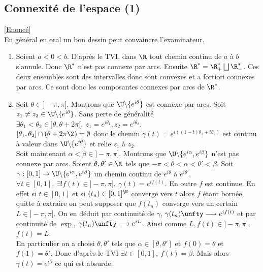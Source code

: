\documentclass{book}
\begin{document}
	\subsection{Connexité de l'espace (1) }
	\label{sec:connexité-de-l'espace-(1)}
	\textcolor{blue}{\hyperref[Connexité de l'espace (1)]{[Enoncé]}}\\
	En général en oral un bon dessin peut convaincre l'examinateur.
	\begin{enumerate}[leftmargin=*]
		\item Soient $a<0<b$. D'après le TVI, dans $\R$ tout chemin continu de $a$ à $b$ s'annule. Donc $\R^*$ n'est pas connexe par arcs. Ensuite $\R^*=\R^*_+\bigsqcup\R^*_-$. Ces deux ensembles sont des intervalles donc sont convexes et a fortiori connexes par arcs. Ce sont donc les composantes connexes par arcs de $\R^*$.
		\item Soit $\theta\in ]-\pi,\pi]$. Montrons que $\U\backslash\{e^{i\theta}\}$ est connexe par arcs. Soit $z_1\ne z_2\in \U\backslash\{e^{i\theta}\}$. Sans perte de généralité $\exists \theta_1<\theta_2\in ]\theta,\theta+2\pi[,\ z_1=e^{i\theta_1},z_2=e^{i\theta_2}$.\\
		$[\theta_1,\theta_2]\cap(\theta+2\pi\Z)=\emptyset$ donc le chemin $\gamma(t)=e^{i((1-t)\theta_1+t\theta_2)}$ est continu à valeur dans $\U\backslash\{e^{i\theta}\}$ et relie $z_1$ à $z_2$.\\
		Soit maintenant $\alpha<\beta\in]-\pi,\pi]$. Montrons que $\U\backslash\{e^{i\alpha},e^{i\beta}\}$ n'est pas connexe par arcs. Soient $\theta,\theta'\in \R$ tels que $-\pi<\theta<\alpha<\theta'<\beta$. Soit $\gamma:[0,1]\to\U\backslash\{e^{i\alpha},e^{i\beta}\}$ un chemin continu de $e^{i\theta}$ à $e^{i\theta'}$. $\forall t\in [0,1],\ \exists! f(t)\in ]-\pi,\pi],\ \gamma(t)=e^{if(t)}$. En outre $f$ est continue. En effet si $t\in [0,1]$ et si $(t_n)\in [0,1]^\N$ converge vers $t$ alors $f$ étant bornée, quitte à extraire on peut supposer que $f(t_n)$ converge vers un certain $L\in ]-\pi,\pi]$. On en déduit par continuité de $\gamma$, $\gamma(t_n)\unfty\longrightarrow e^{if(t)}$ et par continuité de $\exp$, $\gamma(t_n)\unfty\longrightarrow e^{iL}$. Ainsi comme $L,f(t)\in ]-\pi,\pi]$, $f(t)=L$.\\
		En particulier on a choisi $\theta,\theta'$ tels que $\alpha\in [\theta,\theta']$ et $f(0)=\theta$ et $f(1)=\theta'$. Donc d'après le TVI $\exists t\in [0,1],\ f(t)=\beta$. Mais alors $\gamma(t)=e^{i\beta}$ ce qui est absurde.\\\\

\end{enumerate}
\end{document}
